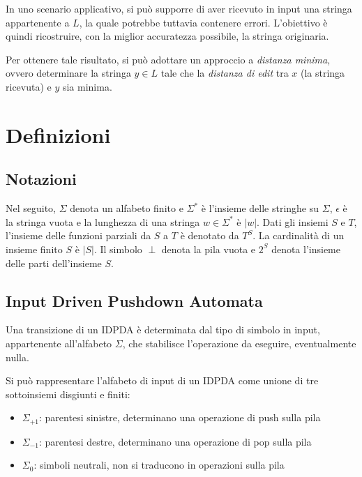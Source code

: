 \documentclass[a4paper,12pt]{report}
\theoremstyle{propositionstyle}
\begin{document}
    In uno scenario applicativo, si può supporre di aver ricevuto in input una stringa appartenente a $L$, la quale potrebbe tuttavia contenere errori.
    L'obiettivo è quindi ricostruire, con la miglior accuratezza possibile, la stringa originaria.

    Per ottenere tale risultato, si può adottare un approccio a \emph{distanza minima}, ovvero determinare la stringa $y \in L$ tale che la \textit{distanza di edit} tra $x$ (la stringa ricevuta) e $y$ sia minima.

    \chapter{Definizioni}

    \section{Notazioni}
    
    Nel seguito, $\Sigma$ denota un alfabeto finito e $\Sigma^*$ è l'insieme delle stringhe su $\Sigma$, $\epsilon$ è la stringa vuota e la lunghezza di una stringa $w \in \Sigma^*$ è $|w|$. Dati gli insiemi $S$ e $T$, l'insieme delle funzioni parziali da $S$ a $T$ è denotato da $T^S$. La cardinalità di un insieme finito $S$ è $|S|$. Il simbolo $\perp$ denota la pila vuota e $2^S$ denota l'insieme delle parti dell'insieme $S$.

    \section{Input Driven Pushdown Automata}

    Una transizione di un IDPDA è determinata dal tipo di simbolo in input, appartenente all'alfabeto $\Sigma$, che stabilisce l'operazione da eseguire, eventualmente nulla.
    
    Si può rappresentare l'alfabeto di input di un IDPDA come unione di tre sottoinsiemi disgiunti e finiti:

    \begin{itemize}
        \item $\Sigma_{+1}$: parentesi sinistre, determinano una operazione di push sulla pila
        \item $\Sigma_{-1}$: parentesi destre, determinano una operazione di pop sulla pila
        \item $\Sigma_{0}$: simboli neutrali, non si traducono in operazioni sulla pila
    \end{itemize}
\end{document}
